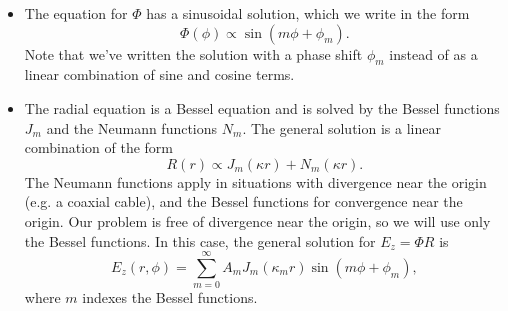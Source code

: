 \documentclass[11pt, a4paper]{article}
\begin{document}
\begin{itemize}
	\item The equation for $ \Phi $ has a sinusoidal solution, which we write in the form
	\begin{equation*}
		\Phi(\phi) \propto \sin(m \phi + \phi_{m}).
	\end{equation*}
	Note that we've written the solution with a phase shift $ \phi_{m} $ instead of as a linear combination of sine and cosine terms.
	
	\item The radial equation is a Bessel equation and is solved by the Bessel functions $ J_{m} $ and the Neumann functions $ N_{m} $. The general solution is a linear combination of the form
	\begin{equation*}
		R(r) \propto J_{m}(\kappa r) + N_{m}(\kappa r).
	\end{equation*}
    The Neumann functions apply in situations with divergence near the origin (e.g. a coaxial cable), and the Bessel functions for convergence near the origin. Our problem is free of divergence near the origin, so we will use only the Bessel functions. In this case, the general solution for $ E_{z} = \Phi R $ is
	\begin{equation*}
        E_{z}(r, \phi) = \sum_{m = 0}^{\infty}A_{m}J_{m}(\kappa_{m} r)\sin(m \phi + \phi_{m}),
	\end{equation*}
    where $ m $ indexes the Bessel functions.
	

\end{itemize}
\end{document}
